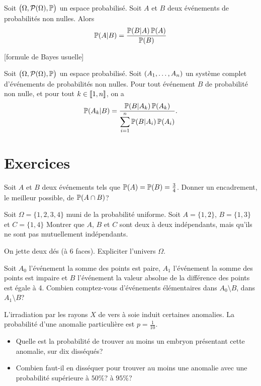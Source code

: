 \documentclass{yann}
\newcommand{\Part}{\mathcal{P}}
\newcommand{\Prob}{\bigl(\Omega, \Part(\Omega), \P\bigr)}
\begin{document}
Soit $\Prob$ un espace probabilisé.
Soit $A$ et $B$ deux événements de probabilités non nulles.
Alors
\[ \P(A|B) = \frac{ \P(B|A)\P(A) }{ \P(B) } \]

[formule de Bayes usuelle]

Soit $\Prob$ un espace probabilisé.
Soit $\nUplet A1n$ un système complet d'événements de probabilités non nulles.
Pour tout événement $B$ de probabilité non nulle,
et pour tout $k\in\Dcro{1,n}$, on a
\[ \P(A_k|B) = \frac{ \P(B|A_k)\P(A_k) }{ \DS \sum_{i=1}^n \P(B|A_i)\P(A_i) }. \]

\section{Exercices}

\Exercice

Soit $A$ et $B$ deux événements tels que $\P(A)=\P(B)=\frac34$.
Donner un encadrement, le meilleur possible, de $\P(A\cap B)$?

\Exercice

Soit $\Omega = \{ 1,2,3,4 \}$ muni de la probabilité uniforme.
Soit $A = \{ 1,2 \}$, $B = \{ 1,3 \}$ et $C = \{ 1,4 \}$
Montrer que $A$, $B$ et $C$ sont deux à deux indépendants,
mais qu'ils ne sont pas mutuellement indépendants.

\Exercice

On jette deux dés (à 6 faces). Expliciter l'univers $\Omega$.

Soit $A_0$ l'événement \og{}la somme des points est paire\fg{},
$A_1$ l'événement \og{}la somme des points est impaire\fg{}
et $B$ l'événement \og{}la valeur absolue de la différence des points est égale à 4\fg{}.
Combien comptez-vous d'événements élémentaires dans $A_0\setminus B$,
dans $A_1\setminus B$?

\Exercice

L'irradiation par les rayons $X$ de vers à soie induit certaines anomalies.
La probabilité d'une anomalie particulière est $p=\frac1{10}$.
\begin{itemize}
\item
Quelle est la probabilité de trouver au moins un embryon présentant
  cette anomalie, sur dix disséqués?
\item
Combien faut-il en disséquer pour trouver au moins une anomalie
  avec une probabilité supérieure à $50\%$? à $95\%$?
\end{itemize}

\Exercice
\end{document}
